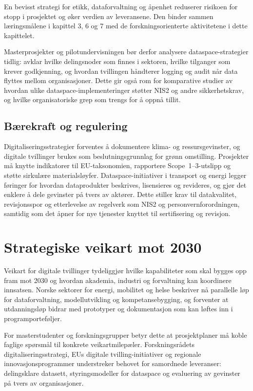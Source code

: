 En bevisst strategi for etikk, dataforvaltning og åpenhet reduserer risikoen for stopp i prosjektet og øker verdien av leveransene. Den binder sammen læringsmålene i kapittel 3, 6 og 7 med de forskningsorienterte aktivitetene i dette kapittelet.

Masterprosjekter og pilotundervisningen bør derfor analysere dataspace-strategier tidlig: avklar hvilke delingsnoder som finnes i sektoren, hvilke tilganger som krever godkjenning, og hvordan tvillingen håndterer logging og audit når data flyttes mellom organisasjoner. Dette gir også rom for komparative studier av hvordan ulike dataspace-implementeringer støtter NIS2 og andre sikkerhetskrav, og hvilke organisatoriske grep som trengs for å oppnå tillit.\citep{rcn2024digitalisering}

\subsection{Bærekraft og regulering}
Digitaliseringsstrategier forventes å dokumentere klima- og ressursgevinster, og digitale tvillinger brukes som beslutningsgrunnlag for grønn omstilling. Prosjekter må knytte indikatorer til EU-taksonomien, rapportere Scope~1--3-utslipp og støtte sirkulære materialsløyfer. Dataspace-initiativer i transport og energi legger føringer for hvordan dataprodukter beskrives, lisensieres og revideres, og gjør det enklere å dele gevinster på tvers av aktører.\citep{ec2023mobilitydataspace} Dette stiller krav til datakvalitet, revisjonsspor og etterlevelse av regelverk som NIS2 og personvernforordningen, samtidig som det åpner for nye tjenester knyttet til sertifisering og revisjon.

\section{Strategiske veikart mot 2030}
Veikart for digitale tvillinger tydeliggjør hvilke kapabiliteter som skal bygges opp fram mot 2030 og hvordan akademia, industri og forvaltning kan koordinere innsatsen.\citep{rcn2023veikart,eu2024digitaltwinroadmap} Norske sektorer for energi, mobilitet og helse beskriver nå parallelle løp for dataforvaltning, modellutvikling og kompetansebygging, og forventer at utdanningsløp bidrar med prototyper og dokumentasjon som kan løftes inn i programporteføljer.

For masterstudenter og forskningsgrupper betyr dette at prosjektplaner må koble faglige spørsmål til konkrete veikartmilepæler. Forskningsrådets digitaliseringsstrategi, EUs digitale tvilling-initiativer og regionale innovasjonsprogrammer understreker behovet for samordnede leveranser: delingsklare datasett, styringsmodeller for dataspace og evaluering av gevinster på tvers av organisasjoner.\citep{rcn2023veikart,rcn2024digitalisering}

